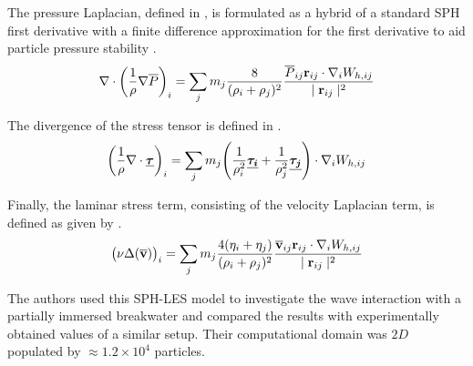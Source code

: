 The pressure Laplacian, defined in , is formulated as a hybrid of a standard SPH first derivative with a finite difference approximation for the first derivative to aid particle pressure stability \parencite{cummins1999sph}.
\begin{equation}
    \nabla \cdot \bigg( \frac{1}{\rho} \nabla \overline{P} \bigg)_i = \sum_j m_j \frac{8}{(\rho_i + \rho_j)^2} \frac{\overline{P}_{ij} \mathbf{r}_{ij} \cdot \nabla_{i} W_{h, ij} }{\mid \mathbf{r}_{ij} \mid^{2}}
    \label{eq:Gotoh2004-p-laplacian-sph}
\end{equation}

The divergence of the stress tensor is defined in .
\begin{equation}
    \bigg( \frac{1}{\rho} \nabla \cdot \underline{\bm{\tau}} \bigg)_i = \sum_j m_j \Bigg( \frac{1}{\rho_i^2}\underline{\bm{\tau_i}} + \frac{1}{\rho_j^2}\underline{\bm{\tau_j}} \Bigg) \cdot \nabla_{i} W_{h, ij}
    \label{eq:Gotoh2004-div-tau-sph}
\end{equation}

Finally, the laminar stress term, consisting of the velocity Laplacian term, is defined as given by .
\begin{equation}
    \big(\nu \Delta(\mathbf{\overline{v}}) \big)_i = \sum_j m_j \frac{4(\eta_i + \eta_j)}{(\rho_i + \rho_j)^2}\frac{\mathbf{\overline{v}}_{ij} \mathbf{r}_{ij} \cdot \nabla_{i} W_{h, ij}}{\mid \mathbf{r}_{ij} \mid^{2}}
    \label{eq:Gotoh2004-vel-laplacian-sph}
\end{equation}

The authors used this SPH-LES model to investigate the wave interaction with a partially immersed breakwater and compared the results with experimentally obtained values of a similar setup. Their computational domain was $2D$ populated by $\approx 1.2 \times  10^4$ particles.

